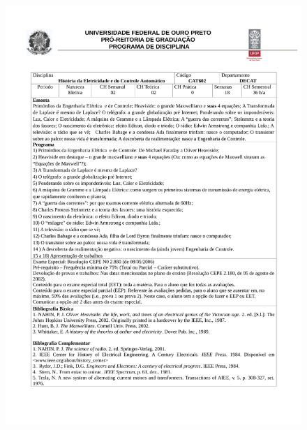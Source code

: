 \begin{figure}[p]
	\centering 
	\includegraphics[scale=0.7]{capitulos/anexo1-programas-disciplina/eg37.pdf}
\end{figure}

